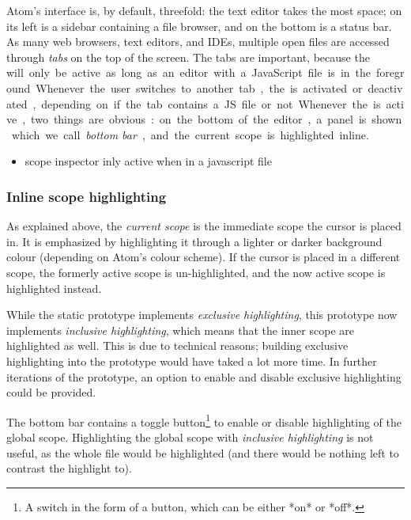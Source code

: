 Atom’s interface is, by default, threefold: the text editor takes the
most space; on its left is a sidebar containing a file browser, and on
the bottom is a status bar. As many web browsers, text editors, and
IDEs, multiple open files are accessed through \emph{tabs} on the top of
the screen. The tabs are important, because the \si will only be active
as long as an editor with a JavaScript file is in the foreground.
Whenever the user switches to another tab, the \si is activated or
deactivated, depending on if the tab contains a JS file or not.

Whenever the \si is active, two things are obvious: on the bottom of the
editor, a panel is shown which we call \emph{bottom bar}, and the
current scope is highlighted inline.

\begin{itemize}
\itemsep1pt\parskip0pt
\item
  scope inspector inly active when in a javascript file
\end{itemize}

\subsubsection{Inline scope
highlighting}\label{inline-scope-highlighting}

As explained above, the \emph{current scope} is the immediate scope the
cursor is placed in. It is emphasized by highlighting it through a
lighter or darker background colour (depending on Atom’s colour scheme).
If the cursor is placed in a different scope, the formerly active scope
is un-highlighted, and the now active scope is highlighted instead.

While the static prototype implements \emph{exclusive highlighting},
this prototype now implements \emph{inclusive highlighting}, which means
that the inner scope are highlighted as well. This is due to technical
reasons; building exclusive highlighting into the prototype would have
taked a lot more time. In further iterations of the prototype, an option
to enable and disable exclusive highlighting could be provided.

The bottom bar contains a toggle
button\footnote{A switch in the form of a button, which can be either *on* or *off*.}
to enable or disable highlighting of the global scope. Highlighting the
global scope with \emph{inclusive highlighting} is not useful, as the
whole file would be highlighted (and there would be nothing left to
contrast the highlight to).

